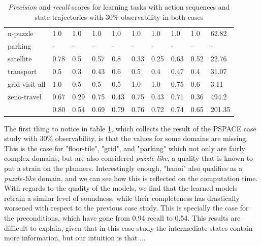 \begin{table}[hbt!]
\begin{center}
\begin{tabular}{l|l|l|l|l|l|l||l|l|l|}
			n-puzzle & 1.0 & 1.0 & 1.0 & 1.0 & 1.0 & 1.0 & 1.0 & 1.0& 62.82 \\ %
			parking & - & - & - & - & - & - & - & - & - \\ %
			satellite & 0.78 & 0.5 & 0.57 & 0.8 & 0.33 & 0.25 & 0.63 & 0.52& 22.76 \\ %
			transport & 0.5 & 0.3 & 0.43 & 0.6 & 0.5 & 0.4 & 0.47 & 0.4& 31.07 \\ %
			grid-visit-all & 1.0 & 0.5 & 0.5 & 0.5 & 1.0 & 1.0 & 0.75 & 0.6& 3.11 \\ %
			zeno-travel & 0.67 & 0.29 & 0.75 & 0.43 & 0.75 & 0.43 & 0.71 & 0.36& 494.2 \\ %
			\hline
			\bf & 0.80 & 0.54 & 0.69 & 0.79 & 0.76 & 0.72 & 0.74 & 0.65 & 201.35 
			
		\end{tabular}
		
	\end{center}
	\caption{\small {\em Precision} and {\em recall} scores for learning tasks with \PO action sequences and \PO state trajectories with 30\% observability in both cases}
	\label{tab:results_minimum_30_30}
\end{table}

The first thing to notice in table \ref{tab:results_minimum_30_30}, which collects the result of the PSPACE case study with 30\% observability, is that the values for some domains are missing. This is the case for "floor-tile", "grid", and "parking" which not only are fairly complex domains, but are also considered \emph{puzzle-like}, a quality that is known to put a strain on the planners. Interestingly enough, "hanoi" also qualifies as a \emph{puzzle-like} domain, and we can see how this is reflected on the computation time. With regards to the quality of the models, we find that the learned models retrain a similar level of soundness, while their completeness has drastically worsened with respect to the previous case study. This is specially the case for the preconditions, which have gone from 0.94 recall to 0.54. This results are difficult to explain, given that in this case study the intermediate states contain more information, but our intuition is that ...

